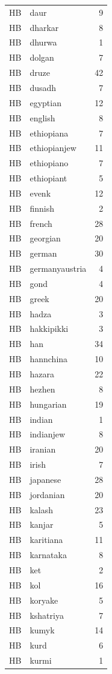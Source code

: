 \begin{longtable}[t]{llr}
HB & daur & 9\\
HB & dharkar & 8\\
HB & dhurwa & 1\\
HB & dolgan & 7\\
HB & druze & 42\\
HB & dusadh & 7\\
HB & egyptian & 12\\
HB & english & 8\\
HB & ethiopiana & 7\\
HB & ethiopianjew & 11\\
HB & ethiopiano & 7\\
HB & ethiopiant & 5\\
HB & evenk & 12\\
HB & finnish & 2\\
HB & french & 28\\
HB & georgian & 20\\
HB & german & 30\\
HB & germanyaustria & 4\\
HB & gond & 4\\
HB & greek & 20\\
HB & hadza & 3\\
HB & hakkipikki & 3\\
HB & han & 34\\
HB & hannchina & 10\\
HB & hazara & 22\\
HB & hezhen & 8\\
HB & hungarian & 19\\
HB & indian & 1\\
HB & indianjew & 8\\
HB & iranian & 20\\
HB & irish & 7\\
HB & japanese & 28\\
HB & jordanian & 20\\
HB & kalash & 23\\
HB & kanjar & 5\\
HB & karitiana & 11\\
HB & karnataka & 8\\
HB & ket & 2\\
HB & kol & 16\\
HB & koryake & 5\\
HB & kshatriya & 7\\
HB & kumyk & 14\\
HB & kurd & 6\\
HB & kurmi & 1\\

\end{longtable}

